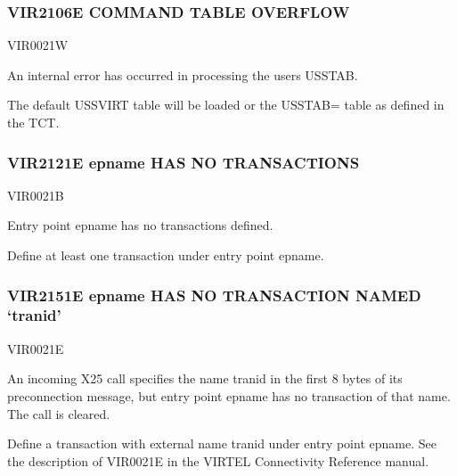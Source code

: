 \documentclass[letterpaper,10pt,english]{sphinxmanual}
\begin{document}
\subsubsection{VIR2106E COMMAND TABLE OVERFLOW}
\label{\detokenize{messages:vir2106e-command-table-overflow}}\begin{description}
\sphinxAtStartPar
VIR0021W

\sphinxAtStartPar
An internal error has occurred in processing the users USSTAB.

\sphinxAtStartPar
The default USSVIRT table will be loaded or the USSTAB= table as defined in the TCT.

\end{description}


\subsubsection{VIR2121E epname HAS NO TRANSACTIONS}
\label{\detokenize{messages:vir2121e-epname-has-no-transactions}}\begin{description}
\sphinxAtStartPar
VIR0021B

\sphinxAtStartPar
Entry point epname has no transactions defined.

\sphinxAtStartPar
Define at least one transaction under entry point epname.

\end{description}


\subsubsection{VIR2151E epname HAS NO TRANSACTION NAMED ‘tranid’}
\label{\detokenize{messages:vir2151e-epname-has-no-transaction-named-tranid}}\begin{description}
\sphinxAtStartPar
VIR0021E

\sphinxAtStartPar
An incoming X25 call specifies the name tranid in the first 8 bytes of its preconnection message, but entry point epname has no transaction of that name. The call is cleared.

\sphinxAtStartPar
Define a transaction with external name tranid under entry point epname. See the description of VIR0021E in the VIRTEL Connectivity Reference manual.

\end{description}
\end{document}
